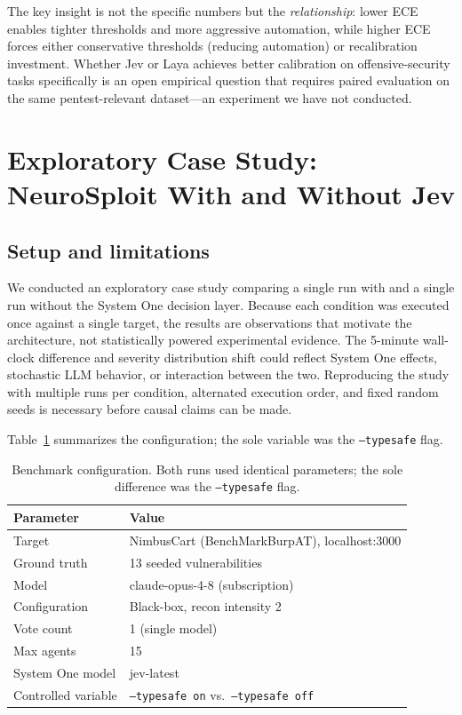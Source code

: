 \documentclass[conference]{IEEEtran}
\begin{document}
The key insight is not the specific numbers but the \emph{relationship}: lower ECE enables tighter thresholds and more aggressive automation, while higher ECE forces either conservative thresholds (reducing automation) or recalibration investment. Whether Jev or Laya achieves better calibration on offensive-security tasks specifically is an open empirical question that requires paired evaluation on the same pentest-relevant dataset---an experiment we have not conducted.

\section{Exploratory Case Study: NeuroSploit With and Without Jev}\label{sec:benchmark}

\subsection{Setup and limitations}

We conducted an exploratory case study comparing a single run with and a single run without the System One decision layer. Because each condition was executed once against a single target, the results are observations that motivate the architecture, not statistically powered experimental evidence. The 5-minute wall-clock difference and severity distribution shift could reflect System One effects, stochastic LLM behavior, or interaction between the two. Reproducing the study with multiple runs per condition, alternated execution order, and fixed random seeds is necessary before causal claims can be made.

Table~\ref{tab:setup} summarizes the configuration; the sole variable was the \texttt{--typesafe} flag.

\begin{table}[h]
\centering
\caption{Benchmark configuration. Both runs used identical parameters; the sole difference was the \texttt{--typesafe} flag.}
\label{tab:setup}
\small
\begin{tabular}{@{}ll@{}}
\toprule
\textbf{Parameter} & \textbf{Value} \\
\midrule
Target & NimbusCart (BenchMarkBurpAT), localhost:3000 \\
Ground truth & 13 seeded vulnerabilities \\
Model & claude-opus-4-8 (subscription) \\
Configuration & Black-box, recon intensity 2 \\
Vote count & 1 (single model) \\
Max agents & 15 \\
System One model & jev-latest \\
Controlled variable & \texttt{--typesafe on} vs.\ \texttt{--typesafe off} \\
\bottomrule
\end{tabular}
\end{table}
\end{document}
